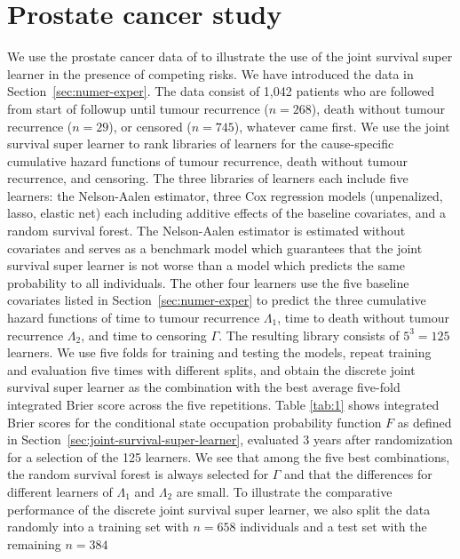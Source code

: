 \documentclass[alpha-refs]{wiley-article}
\newcommand{\1}{\mathbb{1}} %
\begin{document}
\section{Prostate cancer study}
\label{sec:real-data-appl}

We use the prostate cancer data of \cite{kattan2000pretreatment} to
illustrate the use of the joint survival super learner in the presence
of competing risks. We have introduced the data in
Section~\ref{sec:numer-exper}. The data consist of 1,042 patients who
are followed from start of followup until tumour recurrence ($n=268$),
death without tumour recurrence ($n=29$), or censored ($n=745$),
whatever came first. We use the joint survival super learner to rank
libraries of learners for the cause-specific cumulative hazard
functions of tumour recurrence, death without tumour recurrence, and
censoring. The three libraries of learners each include five learners:
the Nelson-Aalen estimator, three Cox regression models (unpenalized,
lasso, elastic net) each including additive effects of the baseline
covariates, and a random survival forest. The Nelson-Aalen estimator
is estimated without covariates and serves as a benchmark model which
guarantees that the joint survival super learner is not worse than a
model which predicts the same probability to all individuals. The
other four learners use the five baseline covariates listed in
Section~\ref{sec:numer-exper} to predict the three cumulative hazard
functions of time to tumour recurrence \( \Lambda_1 \), time to death
without tumour recurrence \( \Lambda_2 \), and time to censoring
$\Gamma$. The resulting library consists of \( 5^3 = 125 \)
learners. We use five folds for training and testing the models,
repeat training and evaluation five times with different splits, and
obtain the discrete joint survival super learner as the combination
with the best average five-fold integrated Brier score across the five
repetitions. Table \ref{tab:1} shows integrated Brier scores for the
conditional state occupation probability function \( F \) as defined
in Section~\ref{sec:joint-survival-super-learner}, evaluated 3 years
after randomization for a selection of the 125 learners. We see that
among the five best combinations, the random survival forest is always
selected for \(\Gamma\) and that the differences for different
learners of \(\Lambda_1\) and \(\Lambda_2\) are small. To illustrate
the comparative performance of the discrete joint survival super
learner, we also split the data randomly into a training set with
\(n=658\) individuals and a test set with the remaining \(n=384\)
\end{document}
